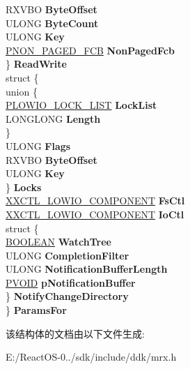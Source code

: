 \begin{DoxyCompactItemize}
\begin{tabbing}
\>\>RXVBO {\bfseries ByteOffset}\\
\>\>ULONG {\bfseries ByteCount}\\
\>\>ULONG {\bfseries Key}\\
\>\>\hyperlink{struct___n_o_n___p_a_g_e_d___f_c_b}{PNON\_PAGED\_FCB} {\bfseries NonPagedFcb}\\
\>\} {\bfseries ReadWrite}\\
\>struct \{\\
\mbox{\label{struct___l_o_w_i_o___c_o_n_t_e_x_t_1_1_0D1702_1_1_0D1704_aa2c44f72764046b09bfa22fe77ad3685}} 
\>\>union \{\\
\>\>\>\hyperlink{struct___l_o_w_i_o___l_o_c_k___l_i_s_t}{PLOWIO\_LOCK\_LIST} {\bfseries LockList}\\
\>\>\>LONGLONG {\bfseries Length}\\
\>\>\} \\
\>\>ULONG {\bfseries Flags}\\
\>\>RXVBO {\bfseries ByteOffset}\\
\>\>ULONG {\bfseries Key}\\
\>\} {\bfseries Locks}\\
\>\hyperlink{struct___x_x_c_t_l___l_o_w_i_o___c_o_m_p_o_n_e_n_t}{XXCTL\_LOWIO\_COMPONENT} {\bfseries FsCtl}\\
\>\hyperlink{struct___x_x_c_t_l___l_o_w_i_o___c_o_m_p_o_n_e_n_t}{XXCTL\_LOWIO\_COMPONENT} {\bfseries IoCtl}\\
\>struct \{\\
\>\>\hyperlink{_processor_bind_8h_a112e3146cb38b6ee95e64d85842e380a}{BOOLEAN} {\bfseries WatchTree}\\
\>\>ULONG {\bfseries CompletionFilter}\\
\>\>ULONG {\bfseries NotificationBufferLength}\\
\>\>\hyperlink{interfacevoid}{PVOID} {\bfseries pNotificationBuffer}\\
\>\} {\bfseries NotifyChangeDirectory}\\
\} {\bfseries ParamsFor}\\

\end{tabbing}\end{DoxyCompactItemize}


该结构体的文档由以下文件生成\+:\begin{DoxyCompactItemize}
\item 
E\+:/\+React\+O\+S-\/0../sdk/include/ddk/mrx.\+h\end{DoxyCompactItemize}
